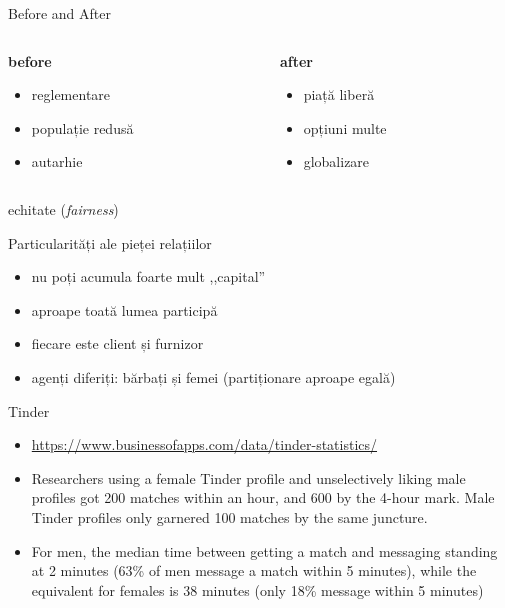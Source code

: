 \documentclass{simple}
\begin{document}
\begin{frame}{Before and After}
  \begin{columns}
    \begin{column}{0.5\textwidth}
      \textbf{before}
        \begin{itemize}
          \scriptsize
          \item reglementare
          \item populație redusă
          \item autarhie
        \end{itemize}
    \end{column}
    \begin{column}{0.5\textwidth}
      \textbf{after}
        \begin{itemize}
          \scriptsize
          \item piață liberă
          \item opțiuni multe
          \item globalizare
        \end{itemize}
    \end{column}
  \end{columns}
\end{frame}

\begin{frame}{}
  \centering
  \vspace{0.5cm}
  \Large{echitate (\textit{fairness})}
\end{frame}

\begin{frame}{Particularități ale pieței relațiilor}
  \begin{itemize}
    \item nu poți acumula foarte mult ,,capital''
    \item aproape toată lumea participă
    \item fiecare este client și furnizor
    \item agenți diferiți: bărbați și femei (partiționare aproape egală)
  \end{itemize}
\end{frame}

\begin{frame}{Tinder}
  \begin{itemize}
    \item \url{https://www.businessofapps.com/data/tinder-statistics/}
    \item Researchers using a female Tinder profile and unselectively liking male profiles got 200 matches within an hour, and 600 by the 4-hour mark. Male Tinder profiles only garnered 100 matches by the same juncture.
    \item For men, the median time between getting a match and messaging standing at 2 minutes (63\% of men message a match within 5 minutes), while the equivalent for females is 38 minutes (only 18\% message within 5 minutes)
  \end{itemize}
\end{frame}
\end{document}
